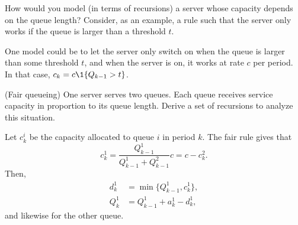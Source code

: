 \begin{exercise}
  How would you model (in terms of recursions) a server whose capacity
  depends on the queue length? Consider, as an example, a rule such
  that the server only works if the queue is larger than a threshold $t$. 
  \begin{solution}
    One model could be to let the server only switch on when the queue
    is larger than some threshold $t$, and when the server is on, it
    works at rate $c$ per period. In that case,
    $c_k = c\1{Q_{k-1} > t}$.
  \end{solution}
\end{exercise}

\begin{exercise}(Fair queueing) One server serves two queues. Each
  queue receives service capacity in proportion to its queue length. Derive a set of recursions to analyze this situation.
  \begin{solution}
    Let $c_k^i$ be the capacity allocated to queue $i$ in period $k$. The fair rule gives that 
    \begin{equation*}
      c_k^1 = \frac{Q_{k-1}^1}{Q_{k-1}^1 + Q_{k-1}^2} c = c - c_k^2. 
    \end{equation*}
Then, 
\begin{equation*}
  \begin{split}
      d_k^1 &= \min\{Q_{k-1}^1, c^1_k\}, \\
Q_k^1 &= Q_{k-1}^1+a_k^1  - d_k^1,
  \end{split}
\end{equation*}
and likewise for the other queue.
  \end{solution}
  \end{exercise}


